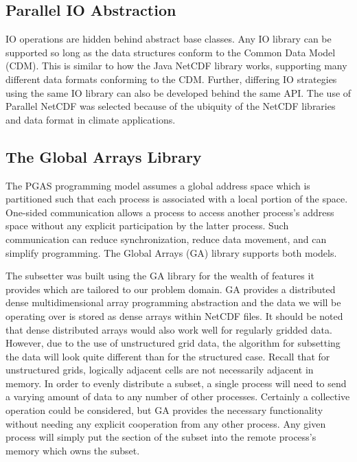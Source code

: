 \subsection{Parallel IO Abstraction}

IO operations are hidden behind abstract base classes.  Any IO library can be
supported so long as the data structures conform to the Common Data Model
(CDM)\cite{CDM}.  This is similar to how the Java NetCDF library works,
supporting many different data formats conforming to the CDM\cite{JavaNetCDF}.
Further, differing IO strategies using the same IO library can also be
developed behind the same API.  The use of Parallel NetCDF was selected
because of the ubiquity of the NetCDF libraries and data format in climate
applications.

\subsection{The Global Arrays Library}

The PGAS programming model assumes a global address space which is partitioned
such that each process is associated with a local portion of the space.
One-sided communication allows a process to access another process's address
space without any explicit participation by the latter process.  Such
communication can reduce synchronization, reduce data movement, and can
simplify programming.  The Global Arrays (GA) library supports both models.

The subsetter was built using the GA library for the wealth of features it
provides which are tailored to our problem domain.  GA provides a distributed
dense multidimensional array programming abstraction and the data we will be
operating over is stored as dense arrays within NetCDF files.  It should be
noted that dense distributed arrays would also work well for regularly gridded
data.  However, due to the use of unstructured grid data, the algorithm for
subsetting the data will look quite different than for the structured case.
Recall that for unstructured grids, logically adjacent cells are not
necessarily adjacent in memory.  In order to evenly distribute a subset, a
single process will need to send a varying amount of data to any number of
other processes.  Certainly a collective operation could be considered, but GA
provides the necessary functionality without needing any explicit cooperation
from any other process.  Any given process will simply put the section of the
subset into the remote process's memory which owns the subset.

